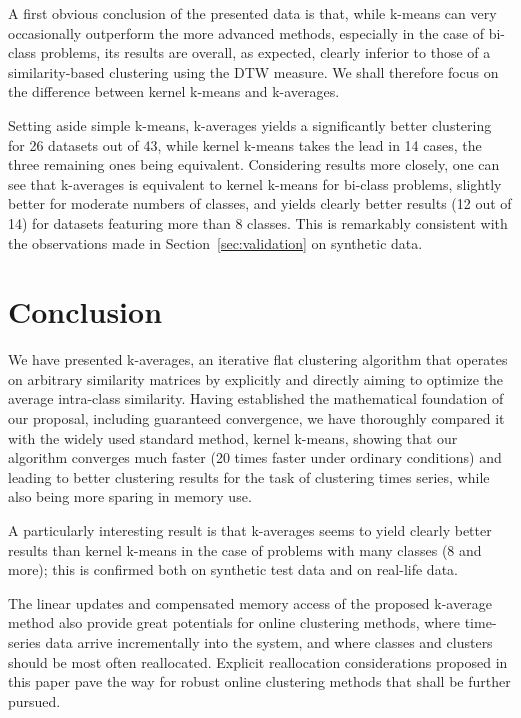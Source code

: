 \documentclass[twoside,11pt]{article}
\begin{document}
A first obvious conclusion of the presented data is that, while k-means can very occasionally outperform the more advanced methods, especially in the case of bi-class problems, its results are overall, as expected, clearly inferior to those of a similarity-based clustering using the DTW measure. We shall therefore focus on the difference between kernel k-means and k-averages.

Setting aside simple k-means, k-averages yields a significantly better clustering for 26 datasets out of 43, while kernel k-means takes the lead in 14 cases, the three remaining ones being equivalent. Considering results more closely, one can see that k-averages is equivalent to kernel k-means for bi-class problems, slightly better for moderate numbers of classes, and yields clearly better results (12 out of 14) for datasets featuring more than 8 classes. This is remarkably consistent with the observations made in Section~\ref{sec:validation} on synthetic data.

\section{Conclusion}

We have presented k-averages, an iterative flat clustering algorithm that operates on arbitrary similarity matrices by explicitly and directly aiming to optimize the average intra-class similarity. Having established the mathematical foundation of our proposal, including guaranteed convergence, we have thoroughly compared it with the widely used standard method, kernel k-means, showing that our algorithm converges much faster (20 times faster under ordinary conditions) and leading to better clustering results for the task of clustering times series, while also being more sparing in memory use.

A particularly interesting result is that k-averages seems to yield clearly better results than kernel k-means in the case of problems with many classes (8 and more); this is confirmed both on synthetic test data and on real-life data.


The linear updates and compensated memory access of the proposed k-average method also provide great potentials for online clustering methods, where time-series data arrive incrementally into the system, and where classes and clusters should be most often reallocated. Explicit reallocation considerations proposed in this paper pave the way for robust online clustering methods that shall be further pursued.
\end{document}

